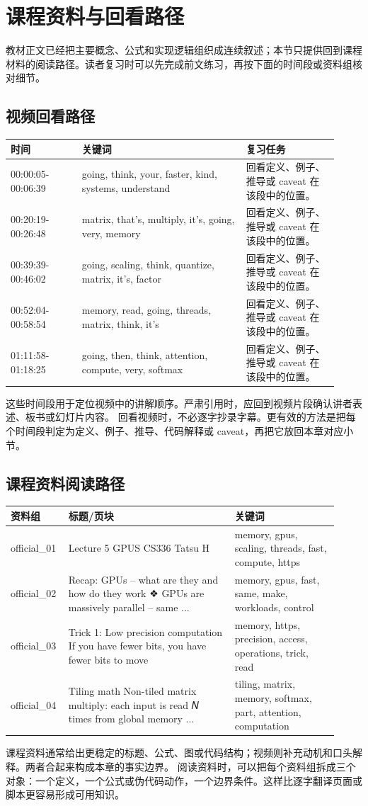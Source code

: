 \documentclass[a4paper]{article}
\begin{document}
\section{课程资料与回看路径}
教材正文已经把主要概念、公式和实现逻辑组织成连续叙述；本节只提供回到课程材料的阅读路径。读者复习时可以先完成前文练习，再按下面的时间段或资料组核对细节。
\subsection{视频回看路径}
\begin{longtable}{p{0.20\linewidth}p{0.46\linewidth}p{0.26\linewidth}}
\toprule
\textbf{时间} & \textbf{关键词} & \textbf{复习任务}\\
\midrule
00:00:05-00:06:39 & going, think, your, faster, kind, systems, understand & 回看定义、例子、推导或 caveat 在该段中的位置。\\
00:20:19-00:26:48 & matrix, that's, multiply, it's, going, very, memory & 回看定义、例子、推导或 caveat 在该段中的位置。\\
00:39:39-00:46:02 & going, scaling, think, quantize, matrix, it's, factor & 回看定义、例子、推导或 caveat 在该段中的位置。\\
00:52:04-00:58:54 & memory, read, going, threads, matrix, think, it's & 回看定义、例子、推导或 caveat 在该段中的位置。\\
01:11:58-01:18:25 & going, then, think, attention, compute, very, softmax & 回看定义、例子、推导或 caveat 在该段中的位置。\\
\bottomrule
\end{longtable}
这些时间段用于定位视频中的讲解顺序。严肃引用时，应回到视频片段确认讲者表述、板书或幻灯片内容。
回看视频时，不必逐字抄录字幕。更有效的方法是把每个时间段判定为定义、例子、推导、代码解释或 caveat，再把它放回本章对应小节。
\subsection{课程资料阅读路径}
\begin{longtable}{p{0.14\linewidth}p{0.48\linewidth}p{0.30\linewidth}}
\toprule
\textbf{资料组} & \textbf{标题/页块} & \textbf{关键词}\\
\midrule
official\_01 & Lecture 5 GPUS CS336 Tatsu H & memory, gpus, scaling, threads, fast, compute, https\\
official\_02 & Recap: GPUs – what are they and how do they work ❖ GPUs are massively parallel – same ... & memory, gpus, fast, same, make, workloads, control\\
official\_03 & Trick 1: Low precision computation If you have fewer bits, you have fewer bits to move & memory, https, precision, access, operations, trick, read\\
official\_04 & Tiling math Non-tiled matrix multiply: each input is read 𝑁 times from global memory ... & tiling, matrix, memory, softmax, part, attention, computation\\
\bottomrule
\end{longtable}
课程资料通常给出更稳定的标题、公式、图或代码结构；视频则补充动机和口头解释。两者合起来构成本章的事实边界。
阅读资料时，可以把每个资料组拆成三个对象：一个定义，一个公式或伪代码动作，一个边界条件。这样比逐字翻译页面或脚本更容易形成可用知识。
\end{document}
